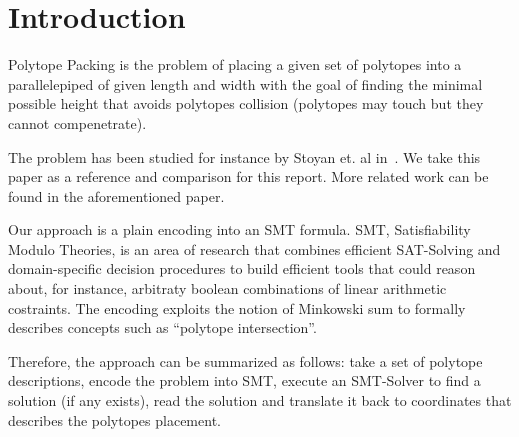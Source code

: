 \section{Introduction}
Polytope Packing is the problem of placing a given set of
polytopes into a parallelepiped of given length and width
with the goal of finding the minimal possible height that
avoids polytopes collision (polytopes may touch but they
cannot compenetrate). 

The problem has been studied for instance by 
Stoyan et. al in~\cite{sto03}. We take this paper as
a reference and comparison for this report. More related
work can be found in the aforementioned paper.

Our approach is a plain encoding into an SMT formula. SMT,
Satisfiability Modulo Theories, is an area of research
that combines efficient SAT-Solving and domain-specific
decision procedures to build efficient tools that could
reason about, for instance, arbitraty boolean combinations 
of linear arithmetic costraints. The encoding exploits
the notion of Minkowski sum to formally describes concepts
such as ``polytope intersection''.

Therefore, the approach can be summarized as follows: 
take a set of polytope descriptions, encode the problem
into SMT, execute an SMT-Solver to find a solution (if any
exists), read the solution and translate it back to
coordinates that describes the polytopes placement.
